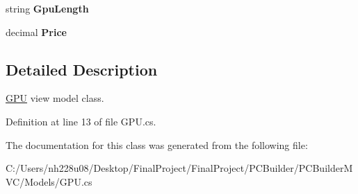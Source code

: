 \begin{DoxyCompactItemize}
\item 
string {\bfseries Gpu\+Length}\hypertarget{class_p_c_builder_m_v_c_1_1_models_1_1_g_p_u_a584361d4507698bc9cb51fee3154102d}{}\label{class_p_c_builder_m_v_c_1_1_models_1_1_g_p_u_a584361d4507698bc9cb51fee3154102d}

\item 
decimal {\bfseries Price}\hypertarget{class_p_c_builder_m_v_c_1_1_models_1_1_g_p_u_ac3a4b525102cbae0f080ce1afae79c7f}{}\label{class_p_c_builder_m_v_c_1_1_models_1_1_g_p_u_ac3a4b525102cbae0f080ce1afae79c7f}

\end{DoxyCompactItemize}


\subsection{Detailed Description}
\hyperlink{class_p_c_builder_m_v_c_1_1_models_1_1_g_p_u}{G\+PU} view model class. 



Definition at line 13 of file G\+P\+U.\+cs.



The documentation for this class was generated from the following file\+:\begin{DoxyCompactItemize}
\item 
C\+:/\+Users/nh228u08/\+Desktop/\+Final\+Project/\+Final\+Project/\+P\+C\+Builder/\+P\+C\+Builder\+M\+V\+C/\+Models/G\+P\+U.\+cs\end{DoxyCompactItemize}
